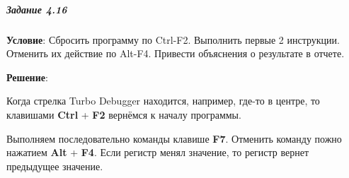 \subparagraph{Задание 4.16}

\textbf{Условие}:
Сбросить программу по Ctrl-F2. Выполнить первые 2 инструкции. Отменить их действие по Alt-F4. Привести объяснения о результате в отчете.

\textbf{Решение}:

Когда стрелка Turbo Debugger находится, например, где-то в центре, то клавишами \textbf{Ctrl} + \textbf{F2} вернёмся к началу программы.

Выполняем последовательно команды клавише \textbf{F7}. Отменить команду пожно нажатием \textbf{Alt} + \textbf{F4}. Если регистр менял значение, то регистр вернет предыдущее значение.
